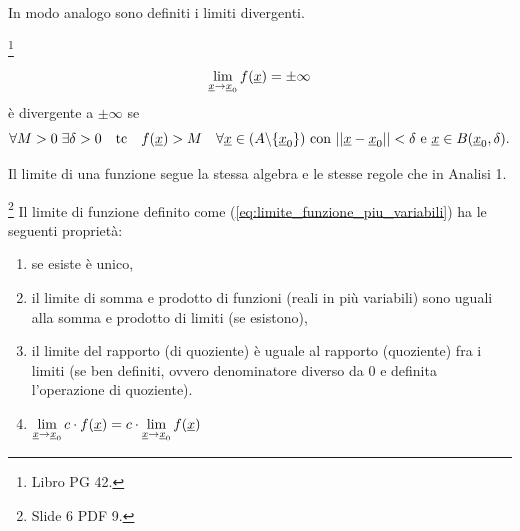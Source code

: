 \addtocounter{footnote}{-1}


In modo analogo sono definiti i limiti divergenti.
\begin{definition}\label{def:limite_epsilon_delta_divergente_piu_variabili}\footnote{Libro PG 42.}
    \begin{equation*}
        \lim\limits_{\uline x\rightarrow\uline x_0}f(\uline x)=\pm\infty
    \end{equation*}
    è divergente a $\pm\infty$ se
    \begin{equation}\label{eq:limite_epsilon_delta_divergente_piu_variabili}
        \forall M>0\;\exists\delta>0\quad\text{tc}\quad f(\uline x)>M \quad \forall\uline x\in(A\backslash\{\uline x_0\}) \text{ con } ||\uline x-\uline x_0||<\delta \text{ e } \uline x\in B(\uline x_0,\delta).
    \end{equation}
\end{definition}

Il limite di una funzione segue la stessa algebra e le stesse regole che in Analisi 1.
\begin{property}\footnote{Slide 6 PDF 9.}
    Il limite di funzione definito come (\ref{eq:limite_funzione_piu_variabili}) ha le seguenti proprietà:
    \begin{enumerate}
        \item se esiste è unico,
        \item il limite di somma e prodotto di funzioni (reali in più variabili) sono uguali alla somma e prodotto di limiti (se esistono),
        \item il limite del rapporto (di quoziente) è uguale al rapporto (quoziente) fra i limiti (se ben definiti, ovvero denominatore diverso da 0 e definita l'operazione di quoziente).
        \item $\lim\limits_{\uline x\rightarrow\uline x_0}c\cdot f(\uline x)=c\cdot\lim\limits_{\uline x\rightarrow \uline x_0}f(\uline x)$
    \end{enumerate}
\end{property}

